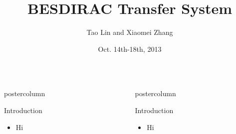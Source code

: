 \documentclass[final]{beamer}
\title[BESDIRAC Transfer System]{\huge BESDIRAC Transfer System}
\author[Tao \& Xiaomei]{Tao Lin and Xiaomei Zhang}
\institute{Institute of High Energy Physics}
\date{Oct. 14th-18th, 2013}
\begin{document}
\begin{frame}{}
    \begin{columns}
        \begin{column}{.49\textwidth}
            \begin{beamercolorbox}[center,wd=\textwidth]{postercolumn}
                \begin{block}{Introduction}
                    \begin{itemize}
                        \item Hi
                    \end{itemize}
                \end{block}
            \end{beamercolorbox}
        \end{column}
        \begin{column}{.49\textwidth}
            \begin{beamercolorbox}[center,wd=\textwidth]{postercolumn}
                \begin{block}{Introduction}
                    \begin{itemize}
                        \item Hi
                    \end{itemize}
                \end{block}
            \end{beamercolorbox}
        \end{column}
    \end{columns}
\end{frame}
\end{document}
